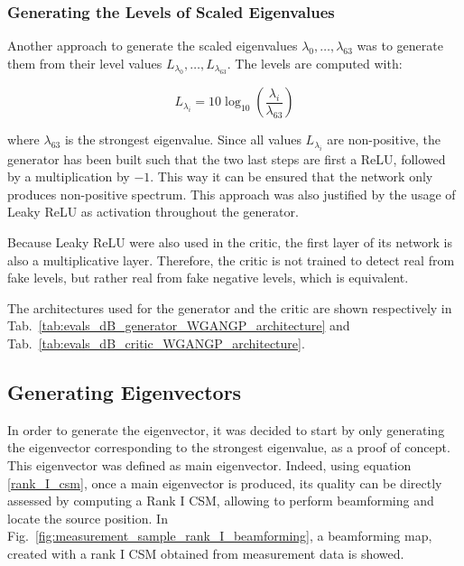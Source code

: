 \documentclass[11pt,a4paper,twoside]{report}
\begin{document}
\subsubsection{Generating the Levels of Scaled Eigenvalues}

Another approach to generate the scaled eigenvalues $\lambda_0, \dots, \lambda_{63}$ was to generate them from their level values $ L_{\lambda_0} , \dots,  L_{\lambda_{63}} $. The levels are computed with:

\begin{equation}
    L_{\lambda_i} = 10 \log_{10}(\frac{\lambda_i}{\lambda_{63}})
\end{equation}

where $\lambda_{63}$ is the strongest eigenvalue.  Since all values $L_{\lambda_i}$ are non-positive, the generator has been built such that the two last steps are first a ReLU, followed by a multiplication by $-1$. This way it can be ensured that the network only produces non-positive spectrum. This approach was also justified by the usage of Leaky ReLU as activation throughout the generator. 

Because Leaky ReLU were also used in the critic, the first layer of its network is also a multiplicative layer. Therefore, the critic is not trained to detect real from fake levels, but rather real from fake negative levels, which is equivalent. 

The architectures used for the generator and the critic are shown respectively in Tab.~\ref{tab:evals_dB_generator_WGANGP_architecture} and Tab.~\ref{tab:evals_dB_critic_WGANGP_architecture}.


\subsection{Generating Eigenvectors}

In order to generate the eigenvector, it was decided to start by only generating the eigenvector corresponding to the strongest eigenvalue, as a proof of concept. This eigenvector was defined as main eigenvector. Indeed, using equation \ref{rank_I_csm}, once a main eigenvector is produced, its quality can be directly assessed by computing a Rank I CSM, allowing to perform beamforming and locate the source position. In Fig.~\ref{fig:measurement_sample_rank_I_beamforming}, a beamforming map, created with a rank I CSM obtained from measurement data is showed.
\end{document}
